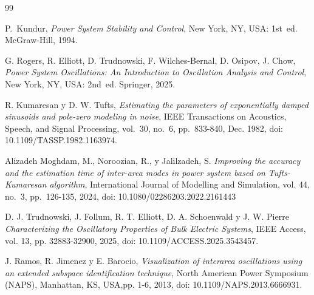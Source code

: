 \documentclass[conference]{IEEEtran}
\begin{document}
\begin{thebibliography}{99}

P.~Kundur, \emph{Power System Stability and Control}, New York, NY, USA: 1st~ed. McGraw-Hill, 1994.


G. Rogers, R. Elliott, D. Trudnowski, F. Wilches-Bernal, D. Osipov, J. Chow, \emph{Power System Oscillations: An Introduction to Oscillation Analysis and Control}, New York, NY, USA: 2nd~ed. Springer, 2025.


R. Kumaresan y D. W. Tufts, \emph{Estimating the parameters of exponentially damped sinusoids and pole-zero modeling in noise}, IEEE Transactions on Acoustics, Speech, and Signal Processing, vol.~30, no.~6, pp.~833-840, Dec. 1982, doi: 10.1109/TASSP.1982.1163974.


Alizadeh Moghdam, M., Noroozian, R., y Jalilzadeh, S. \emph{Improving the accuracy and the estimation time of inter-area modes in power system based on Tufts-Kumaresan algorithm}, International Journal of Modelling and Simulation, vol. 44, no.~3, pp.~126-135, 2024, doi: 10.1080/02286203.2022.2161443 


D. J. Trudnowski, J. Follum, R. T. Elliott, D. A. Schoenwald y J. W. Pierre \emph{Characterizing the Oscillatory Properties of Bulk Electric Systems}, IEEE Access, vol. 13, pp. 32883-32900, 2025, doi: 10.1109/ACCESS.2025.3543457.


J. Ramos, R. Jimenez y E. Barocio, \emph{Visualization of interarea oscillations using an extended subspace identification technique}, North American Power Symposium (NAPS), Manhattan, KS, USA,pp. 1-6, 2013, doi: 10.1109/NAPS.2013.6666931.


\end{thebibliography}
\end{document}

